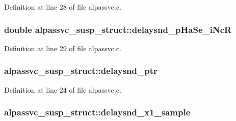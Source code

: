 Definition at line 28 of file alpassvc.\+c.

\subsubsection[{\texorpdfstring{delaysnd\+\_\+p\+Ha\+Se\+\_\+i\+NcR}{delaysnd_pHaSe_iNcR}}]{\setlength{\rightskip}{0pt plus 5cm}double alpassvc\+\_\+susp\+\_\+struct\+::delaysnd\+\_\+p\+Ha\+Se\+\_\+i\+NcR}\hypertarget{structalpassvc__susp__struct_a76f7235fba6c2bc4552f961440e3852d}{}\label{structalpassvc__susp__struct_a76f7235fba6c2bc4552f961440e3852d}


Definition at line 29 of file alpassvc.\+c.

\subsubsection[{\texorpdfstring{delaysnd\+\_\+ptr}{delaysnd_ptr}}]{ alpassvc\+\_\+susp\+\_\+struct\+::delaysnd\+\_\+ptr}\hypertarget{structalpassvc__susp__struct_a81f640c39b6c3a71a17cd5c6dceb48e0}{}\label{structalpassvc__susp__struct_a81f640c39b6c3a71a17cd5c6dceb48e0}


Definition at line 24 of file alpassvc.\+c.

\subsubsection[{\texorpdfstring{delaysnd\+\_\+x1\+\_\+sample}{delaysnd_x1_sample}}]{ alpassvc\+\_\+susp\+\_\+struct\+::delaysnd\+\_\+x1\+\_\+sample}\hypertarget{structalpassvc__susp__struct_a3126cffbf06e8fb4b55f6902764b6f1a}{}\label{structalpassvc__susp__struct_a3126cffbf06e8fb4b55f6902764b6f1a}


